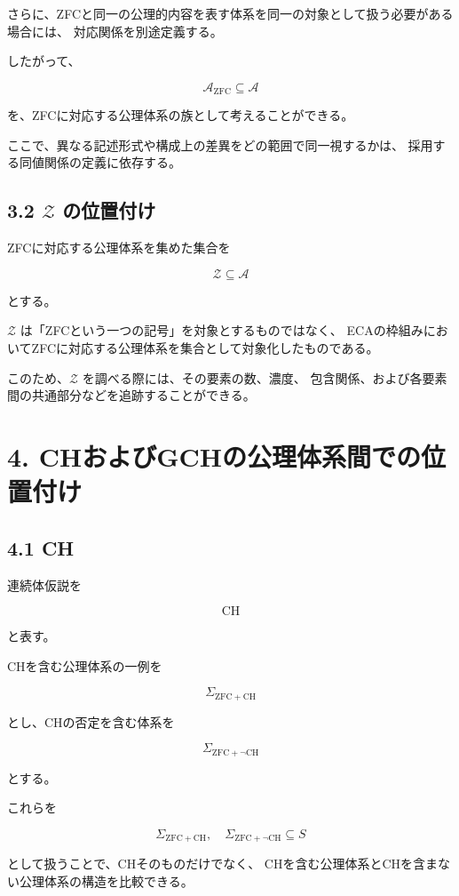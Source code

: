 \documentclass[11pt]{article}
\begin{document}
さらに、ZFCと同一の公理的内容を表す体系を同一の対象として扱う必要がある場合には、
対応関係を別途定義する。

したがって、

\[
\mathscr{A}_{\mathrm{ZFC}}
\subseteq
\mathscr{A}
\]

を、ZFCに対応する公理体系の族として考えることができる。

ここで、異なる記述形式や構成上の差異をどの範囲で同一視するかは、
採用する同値関係の定義に依存する。

\subsection{3.2 $\mathcal{Z}$ の位置付け}

ZFCに対応する公理体系を集めた集合を

\[
\mathcal{Z}\subseteq\mathscr{A}
\]

とする。

$\mathcal{Z}$ は「ZFCという一つの記号」を対象とするものではなく、
ECAの枠組みにおいてZFCに対応する公理体系を集合として対象化したものである。

このため、$\mathcal{Z}$ を調べる際には、その要素の数、濃度、
包含関係、および各要素間の共通部分などを追跡することができる。

\section{4. CHおよびGCHの公理体系間での位置付け}

\subsection{4.1 CH}

連続体仮説を

\[
\mathrm{CH}
\]

と表す。

CHを含む公理体系の一例を

\[
\Sigma_{\mathrm{ZFC+CH}}
\]

とし、CHの否定を含む体系を

\[
\Sigma_{\mathrm{ZFC+\neg CH}}
\]

とする。

これらを

\[
\Sigma_{\mathrm{ZFC+CH}},
\quad
\Sigma_{\mathrm{ZFC+\neg CH}}
\subseteq S
\]

として扱うことで、CHそのものだけでなく、
CHを含む公理体系とCHを含まない公理体系の構造を比較できる。
\end{document}
